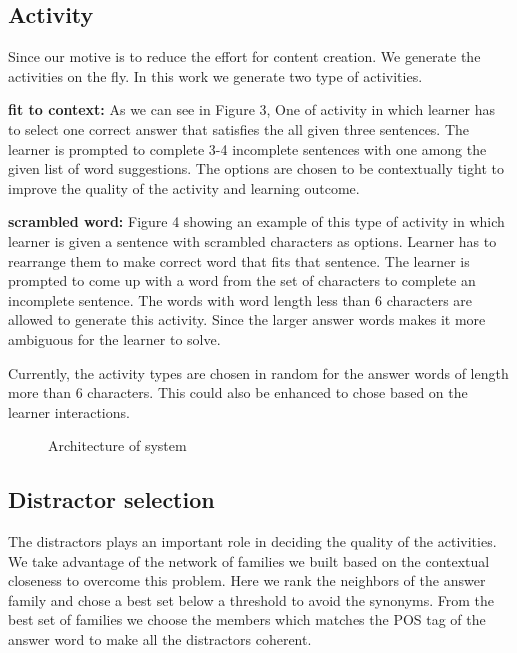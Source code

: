 \documentclass[11pt,a4paper]{article}
\begin{document}
\subsection{Activity}
Since our motive is to reduce the effort for content creation. We generate the
activities on the fly. In this work we generate two type of activities. 

\textbf{fit to context:} As we can see in  Figure 3, One of activity in which learner has to select one correct answer that satisfies the all given three sentences. The learner is prompted to complete 3-4 incomplete
sentences with one among the given list of word suggestions. The options are
chosen to be contextually tight to improve the quality of the activity and
learning outcome.

\textbf{scrambled word:}  Figure 4 showing an example of this type of activity in which learner is given a sentence with scrambled characters as options. Learner has to rearrange them to make correct word that fits that sentence.  The learner is prompted to come up with a word from the set of characters to complete an incomplete sentence. The words with word length
less than 6 characters are allowed to generate this activity. Since the larger
answer words makes it more ambiguous for the learner to solve.

Currently, the activity types are chosen in random for the answer words of length
more than 6 characters. This could also be enhanced to chose based on the learner
interactions.

\begin{figure}
\begin{tcbraster}[raster columns=1, enhanced, blankest]
\caption{Architecture of system}

\end{tcbraster}
\end{figure}

\subsection{Distractor selection}
The distractors plays an important role in deciding the quality of the activities.
We take advantage of the network of families we built based on the contextual
closeness to overcome this problem. Here we rank the neighbors of the
answer family and chose a best set below a threshold to avoid the synonyms. From
the best set of families we choose the members which matches the POS tag of the
answer word to make all the distractors coherent.
\end{document}
